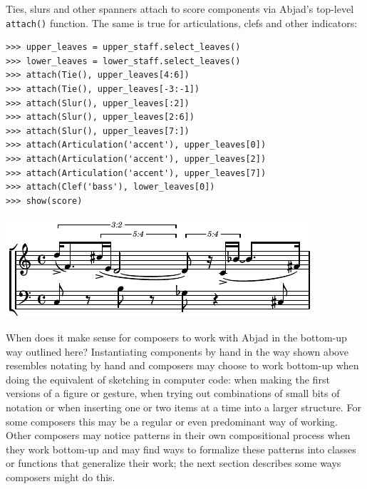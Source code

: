 \documentclass{article}
\begin{document}
\noindent Ties, slurs and other spanners attach to score components via Abjad's
top-level \texttt{attach()} function. The same is true for articulations, clefs
and other indicators:

\begin{lstlisting}
>>> upper_leaves = upper_staff.select_leaves()
>>> lower_leaves = lower_staff.select_leaves()
>>> attach(Tie(), upper_leaves[4:6])
>>> attach(Tie(), upper_leaves[-3:-1])
>>> attach(Slur(), upper_leaves[:2])
>>> attach(Slur(), upper_leaves[2:6])
>>> attach(Slur(), upper_leaves[7:])
>>> attach(Articulation('accent'), upper_leaves[0])
>>> attach(Articulation('accent'), upper_leaves[2])
>>> attach(Articulation('accent'), upper_leaves[7])
>>> attach(Clef('bass'), lower_leaves[0])
>>> show(score)
\end{lstlisting}
\includegraphics{assets/lilypond-b8f044cb7178ea31797238c629d3f54c.pdf}

\noindent When does it make sense for composers to work with Abjad in the
bottom-up way outlined here? Instantiating components by hand in the way shown
above resembles notating by hand and composers may choose to work bottom-up
when doing the equivalent of sketching in computer code: when making the first
versions of a figure or gesture, when trying out combinations of small bits of
notation or when inserting one or two items at a time into a larger structure.
For some composers this may be a regular or even predominant way of working.
Other composers may notice patterns in their own compositional process when
they work bottom-up and may find ways to formalize these patterns into classes
or functions that generalize their work; the next section describes some ways
composers might do this.
\end{document}
